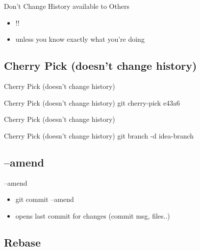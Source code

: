 \documentclass{beamer}
\begin{document}
\begin{frame}{Don't Change History available to Others}
  \begin{itemize}
    \item
      !!
    \item
      unless you know exactly what you're doing
  \end{itemize}
\end{frame}

\subsection{Cherry Pick (doesn't change history)}

\begin{frame}{Cherry Pick (doesn't change history)}
    \centering
    \hfill\vfill
\end{frame}

\begin{frame}{Cherry Pick (doesn't change history)}
  git cherry-pick e43a6
\end{frame}

\begin{frame}{Cherry Pick (doesn't change history)}
    \centering
    \hfill\vfill
\end{frame}

\begin{frame}{Cherry Pick (doesn't change history)}
  git branch -d idea-branch
\end{frame}

\subsection{--amend}

\begin{frame}{--amend}
  \begin{itemize}
    \item
      git commit --amend
    \item
      opens last commit for changes (commit msg, files..)
  \end{itemize}
\end{frame}

\subsection{Rebase}
\end{document}

